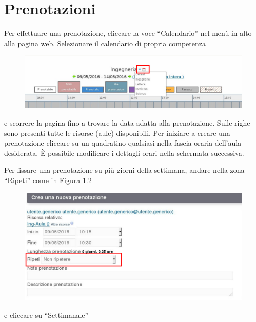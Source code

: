 \chapter{Prenotazioni}
Per effettuare una prenotazione, cliccare la voce ``Calendario'' nel menù in alto alla pagina web.
Selezionare il calendario di propria competenza
\begin{figure}[H]
\centering{}\includegraphics[scale=0.5]{Immagini/calendari_selezione.pdf}
\normalsize
\caption{}
\label{fig:calendari_selezione.pdf}
\end{figure}

e scorrere la pagina fino a trovare la data adatta alla prenotazione. Sulle righe
sono presenti tutte le risorse (aule) disponibili.
Per iniziare a creare una prenotazione cliccare su un quadratino qualsiasi nella fascia oraria
dell'aula desiderata. È possibile modificare i dettagli orari nella schermata
successiva.

Per fissare una prenotazione su più giorni della settimana, andare nella zona ``Ripeti'' come in Figura
\ref{fig:prenotazione_ripetizione_1.pdf}

\begin{figure}[H]
\centering{}\includegraphics[scale=0.5]{Immagini/prenotazione_ripetizione_1.pdf}
\normalsize
\caption{}
\label{fig:prenotazione_ripetizione_1.pdf}
\end{figure}

e cliccare su ``Settimanale''

